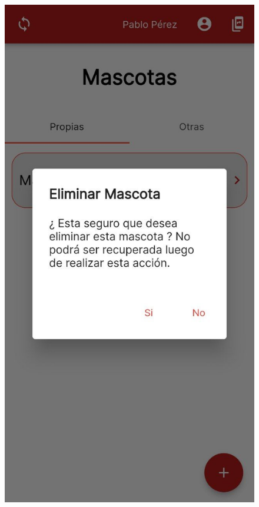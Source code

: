 \begin{figure}[h!]
\begin{center}
\includegraphics[scale=0.19]{Graphics/images/hcvet/delete.jpg}
\label{fig:bac}

\end{center}
\end{figure}

